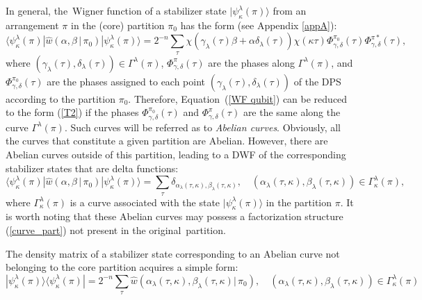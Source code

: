 \documentclass[quantumrep,article,accept,pdftex,moreauthors]{Definitions/mdpi}
\begin{document}
In general, the~Wigner function of a stabilizer state
$|\psi_{\kappa}^{\lambda}(\pi)\rangle$ from an  arrangement $\pi$ in the (core)
partition $\pi_{0}$ has the form (see Appendix \ref{appA}):
\begin{equation}
  \langle \psi_{\kappa}^{\lambda}(\pi)
  |\hat{w}\left( \alpha,\beta\,|\,\pi_{0}\right)
  |\psi_{\kappa}^{\lambda}(\pi)\rangle
  = 2^{-n}
  \sum_{\tau} \chi\left(
    \gamma_{\lambda}(\tau)\beta+\alpha \delta_{\lambda}(\tau)
  \right)
  \chi(\kappa\tau) \Phi_{\gamma,\delta}^{\pi_{0}}(\tau)
  \Phi_{\gamma,\delta}^{\pi\ast}(\tau),
  \label{WF qubit}
\end{equation}
where $\left(\gamma_{\lambda}(\tau),\delta_{\lambda}(\tau)\right) \in
\Gamma^{\lambda}(\pi)$, $\Phi_{\gamma,\delta }^{\pi}(\tau)$ are the phases
along $\Gamma^{\lambda}(\pi)$, and $\Phi_{\gamma,\delta}^{\pi_{0}}(\tau)$ are the
phases assigned to each point $\left(
\gamma_{\lambda}(\tau),\delta_{\lambda}(\tau)\right)$ of the DPS according to
the partition $\pi_{0}$. Therefore, Equation~(\ref{WF qubit}) can be reduced to the
form (\ref{T2}) if the phases $\Phi_{\gamma,\delta }^{\pi_{0}}(\tau )$ and
$\Phi_{\gamma,\delta}^{\pi}(\tau )$ are the same along the curve
$\Gamma^{\lambda}(\pi)$. Such curves will be referred as to \textit{Abelian
curves}. Obviously, all the curves that constitute a given partition are
Abelian. However, there are Abelian curves outside of this partition, leading to
a DWF of the corresponding stabilizer states that are delta functions:
\begin{equation}
  \langle \psi_{\kappa }^{\lambda}
  (\pi)|\hat{w} \left(\alpha,\beta \,|\,\pi_{0}\right)
  |\psi_{\kappa }^{\lambda}(\pi)\rangle
  = \sum_{\tau }
  \delta_{\alpha_{\lambda}(\tau,\kappa),\beta_{\lambda}(\tau,\kappa)},
  \quad \left(
    \alpha_{\lambda}(\tau,\kappa), \beta_{\lambda}(\tau,\kappa)
  \right) \in \Gamma_{\kappa }^{\lambda }(\pi),
\end{equation}
where $\Gamma_{\kappa }^{\lambda}(\pi)$ is a curve associated with the state
$|\psi_{\kappa }^{\lambda }(\pi)\rangle$ in the partition $\pi$. It is worth
noting that these Abelian curves may possess a factorization structure
(\ref{curve_part}) not present in the original~partition. 

The density matrix of a stabilizer state corresponding to an Abelian curve not
belonging to the core partition acquires a simple form:
\begin{equation}
  |\psi_{\kappa }^{\lambda}(\pi)\rangle
  \langle \psi_{\kappa }^{\lambda }(\pi)|
  = 2^{-n} \sum_{\tau}
  \hat{w}(\alpha_{\lambda}(\tau,\kappa),\beta_{\lambda}(\tau,\kappa)|\,\pi_{0}),
  \quad \left(
    \alpha_{\lambda }(\tau,\kappa),\beta_{\lambda}(\tau,\kappa)
  \right)
  \in \Gamma_{\kappa}^{\lambda}(\pi)
\end{equation}
\end{document}
